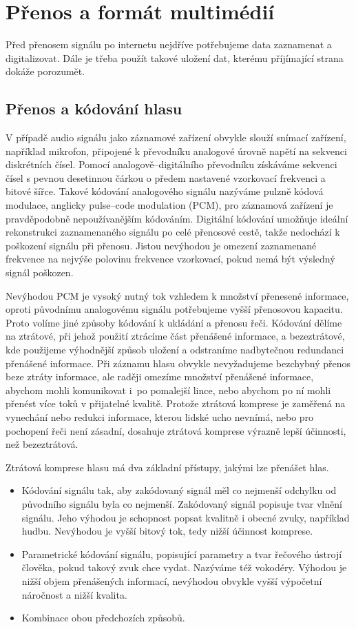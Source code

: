 \chapter{Přenos a formát multimédií}

Před přenosem signálu po internetu nejdříve potřebujeme data zaznamenat a
digitalizovat. Dále je třeba použít takové uložení dat, kterému příjímající
strana dokáže porozumět.

\section{Přenos a kódování hlasu}

V případě audio signálu jako záznamové zařízení obvykle
slouží snímací zařízení, například mikrofon, připojené k převodníku
analogové úrovně napětí na sekvenci diskrétních čísel. Pomocí analogově--digitálního
převodníku získáváme sekvenci čísel s pevnou desetinnou čárkou 
o předem nastavené vzorkovací frekvenci a bitové šířce.
Takové kódování analogového signálu nazýváme pulzně kódová modulace, 
anglicky pulse--code modulation (PCM), pro záznamová zařízení je pravděpodobně
nepoužívanějším kódováním.
Digitální kódování umožňuje ideální
rekonstrukci zaznamenaného signálu po celé přenosové cestě, takže nedochází
k poškození signálu při přenosu. Jistou nevýhodou je omezení zaznamenané 
frekvence na nejvýše polovinu frekvence vzorkovací, pokud nemá být výsledný
signál poškozen.

Nevýhodou PCM je vysoký nutný tok vzhledem k množství přenesené informace\cite{digital_speech}, oproti původnímu analogovému signálu potřebujeme vyšší přenosovou kapacitu. Proto volíme jiné způsoby kódování k ukládání a přenosu řeči.
Kódování dělíme na ztrátové, při jehož použití ztrácíme část přenášené 
informace, a bezeztrátové, kde použijeme výhodnější způsob uložení a odstraníme
nadbytečnou redundanci přenášené informace. Při záznamu hlasu obvykle 
nevyžadujeme bezchybný přenos beze ztráty informace, ale raději omezíme 
množství přenášené informace, abychom mohli komunikovat i~po pomalejší lince,
nebo abychom po ní mohli přenést více toků v přijatelné kvalitě.
Protože ztrátová komprese je zaměřená na vynechání nebo redukci informace, 
kterou lidské
ucho nevnímá, nebo pro pochopení řeči není zásadní, dosahuje ztrátová komprese
výrazně lepší účinnosti, než bezeztrátová. 

Ztrátová komprese hlasu má dva základní přístupy, jakými lze přenášet hlas.
\begin{itemize}
\item{Kódování signálu tak, aby zakódovaný signál měl co nejmenší
odchylku od původního signálu byla co nejmenší. Zakódovaný signál popisuje
tvar vlnění signálu. Jeho výhodou je schopnost popsat kvalitně i obecné zvuky,
například hudbu. Nevýhodou je vyšší bitový tok, tedy nižší účinnost komprese.}
\item{Parametrické kódování signálu, popisující parametry a tvar řečového 
ústrojí člověka, pokud takový zvuk chce vydat. Nazýváme též vokodéry. 
Výhodou je nižší objem 
přenášených informací, nevýhodou obvykle vyšší výpočetní náročnost a nižší 
kvalita.}
\item{Kombinace obou předchozích způsobů.}
\end{itemize}

